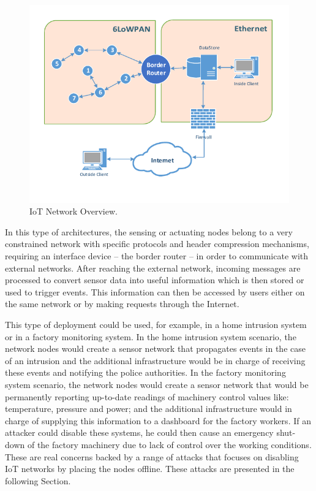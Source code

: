\documentclass{llncs}
\begin{document}
\begin{figure}[h]
  \centering
  \includegraphics[width=1.0\linewidth]{figures/Network_Overview.pdf}
  \caption{IoT Network Overview.}
  \label{fig:net_overview}
\end{figure}

In this type of architectures, the sensing or actuating nodes belong to a very constrained network with specific protocols and header compression mechanisms, requiring an interface device -- the border router -- in order to communicate with external networks.
After reaching the external network, incoming messages are processed to convert sensor data into useful information which is then stored or used to trigger events. 
This information can then be accessed by users either on the same network or by making requests through the Internet. 

This type of deployment could be used, for example, in a home intrusion system or in a factory monitoring system. 
In the home intrusion system scenario, the network nodes would create a sensor network that propagates events in the case of an intrusion and the additional infrastructure would be in charge of receiving these events and notifying the police authorities. 
In the factory monitoring system scenario, the network nodes would create a sensor network that would be permanently reporting up-to-date readings of machinery control values like: temperature, pressure and power; 
and the additional infrastructure would in charge of supplying this information to a dashboard for the factory workers. 
If an attacker could disable these systems, he could then 
cause an emergency shut-down of the factory machinery due to lack of control over the working conditions. 
These are real concerns backed by a range of attacks that focuses on disabling \ac{IoT} networks by placing the nodes offline. These attacks are presented in the following Section.
\end{document}
